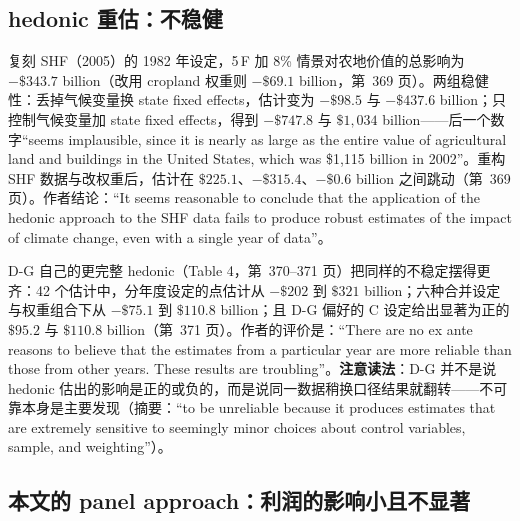 \subsection{hedonic 重估：不稳健}

复刻 SHF（2005）的 1982 年设定，5\,F 加 8\% 情景对农地价值的总影响为 $-\$343.7$ billion（改用 cropland 权重则 $-\$69.1$ billion，第~369 页）。两组稳健性：丢掉气候变量换 state fixed effects，估计变为 $-\$98.5$ 与 $-\$437.6$ billion；只控制气候变量加 state fixed effects，得到 $-\$747.8$ 与 $\$1{,}034$ billion——后一个数字``seems implausible, since it is nearly as large as the entire value of agricultural land and buildings in the United States, which was \$1,115 billion in 2002''\citep[第~369 页]{deschenes2007economic}。重构 SHF 数据与改权重后，估计在 $\$225.1$、$-\$315.4$、$-\$0.6$ billion 之间跳动（第~369 页）。作者结论：``It seems reasonable to conclude that the application of the hedonic approach to the SHF data fails to produce robust estimates of the impact of climate change, even with a single year of data''\citep[第~369 页]{deschenes2007economic}。

D-G 自己的更完整 hedonic（Table 4，第~370--371 页）把同样的不稳定摆得更齐：42 个估计中，分年度设定的点估计从 $-\$202$ 到 $\$321$ billion；六种合并设定与权重组合下从 $-\$75.1$ 到 $\$110.8$ billion；且 D-G 偏好的 C 设定给出显著为正的 $\$95.2$ 与 $\$110.8$ billion（第~371 页）。作者的评价是：``There are no ex ante reasons to believe that the estimates from a particular year are more reliable than those from other years. These results are troubling''\citep[第~371 页]{deschenes2007economic}。\textbf{注意读法}：D-G 并不是说 hedonic 估出的影响是正的或负的，而是说同一数据稍换口径结果就翻转——不可靠本身是主要发现（摘要：``to be unreliable because it produces estimates that are extremely sensitive to seemingly minor choices about control variables, sample, and weighting''\citep[第~354 页]{deschenes2007economic}）。

\subsection{本文的 panel approach：利润的影响小且不显著}

